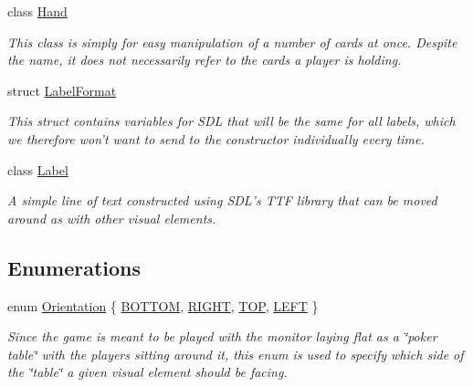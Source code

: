 \begin{DoxyCompactItemize}
class \hyperlink{classGUI_1_1Hand}{Hand}
\begin{DoxyCompactList}\small\item\em This class is simply for easy manipulation of a number of cards at once. Despite the name, it does not necessarily refer to the cards a player is holding. \end{DoxyCompactList}\item 
struct \hyperlink{structGUI_1_1LabelFormat}{Label\-Format}
\begin{DoxyCompactList}\small\item\em This struct contains variables for S\-D\-L that will be the same for all labels, which we therefore won't want to send to the constructor individually every time. \end{DoxyCompactList}\item 
class \hyperlink{classGUI_1_1Label}{Label}
\begin{DoxyCompactList}\small\item\em A simple line of text constructed using S\-D\-L's T\-T\-F library that can be moved around as with other visual elements. \end{DoxyCompactList}\end{DoxyCompactItemize}
\subsection*{Enumerations}
\begin{DoxyCompactItemize}
\item 
enum \hyperlink{namespaceGUI_a1a3a8094d47f7be06ce123fab38abf6a}{Orientation} \{ \hyperlink{namespaceGUI_a1a3a8094d47f7be06ce123fab38abf6aafb2c9cf323a63df7a7ac4ade2e4e63e5}{B\-O\-T\-T\-O\-M}, 
\hyperlink{namespaceGUI_a1a3a8094d47f7be06ce123fab38abf6aaed947a071b4f5078a2c7d5bd873ed851}{R\-I\-G\-H\-T}, 
\hyperlink{namespaceGUI_a1a3a8094d47f7be06ce123fab38abf6aa355815f18587c25fe8f1faaf5aca1fe2}{T\-O\-P}, 
\hyperlink{namespaceGUI_a1a3a8094d47f7be06ce123fab38abf6aac41dc6ce32c46ed2258169c4844727ff}{L\-E\-F\-T}
 \}
\begin{DoxyCompactList}\small\item\em Since the game is meant to be played with the monitor laying flat as a \char`\"{}poker table\char`\"{} with the players sitting around it, this enum is used to specify which side of the \char`\"{}table\char`\"{} a given visual element should be facing. \end{DoxyCompactList}\end{DoxyCompactItemize}


